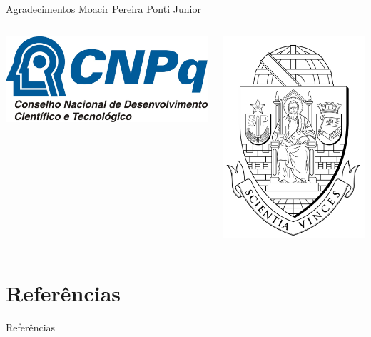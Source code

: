 \documentclass{beamer}
\begin{document}
\begin{frame}{Agradecimentos}
  Moacir Pereira Ponti Junior

\begin{columns}
  \begin{column}{0.5\textwidth}
  \centering
    \includegraphics[width=0.6\columnwidth]{figuras/cnpqLogo.jpg}
  \end{column}
  \begin{column}{0.5\textwidth}
  \centering
    \includegraphics[width=0.6\columnwidth]{figuras/brasao_usp_pb}
  \end{column}
\end{columns}
\end{frame}
\section{Referências}
\begin{frame}{Referências}
\end{frame}
\begin{frame}[plain]
  \maketitle
\end{frame}
\end{document}
